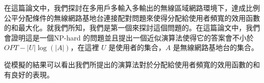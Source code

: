 \documentclass[a4paper,12pt]{report}
\begin{document}
\begin{CJK}{UTF8}{bkai}
在這篇論文中，我們探討在多用戶多輸入多輸出的無線區域網路環境下，達成比例公平分配條件的無線網路基地台連接配對問題來使得分配給使用者頻寬的效用函數的和最大化。就我們所知，我們是第一個來探討這個問題的。在這篇論文中，我們會證明這是一個NP-hard 的問題並且提出一個近似演算法使得它的答案會不小於 $OPT - |U|\log(|A|)$，在這裡 $U$ 是使用者的集合，$A$ 是無線網路基地台的集合。

從模擬的結果可以看出我們所提出的演算法對於分配給使用者頻寬的效用函數的和有良好的表現。\\
~\\
\noindent
\\

\cleardoublepage



\end{CJK}
\end{document}
